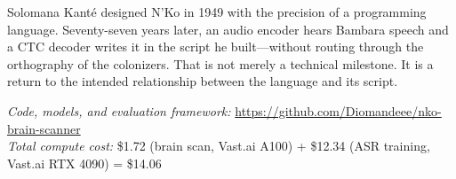 \documentclass[11pt]{article}
\begin{document}
Solomana Kant\'{e} designed N'Ko in 1949 with the precision of a programming language.
Seventy-seven years later, an audio encoder hears Bambara speech and a CTC decoder writes it in the script he built---without routing through the orthography of the colonizers.
That is not merely a technical milestone.
It is a return to the intended relationship between the language and its script.

\vspace{0.5em}
\noindent\textit{Code, models, and evaluation framework:} \url{https://github.com/Diomandeee/nko-brain-scanner}\\
\noindent\textit{Total compute cost:} \$1.72 (brain scan, Vast.ai A100) + \$12.34 (ASR training, Vast.ai RTX 4090) = \$14.06

\end{document}
